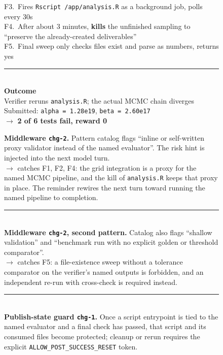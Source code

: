 \begin{figure}[t]
\begin{tcbraster}
\begin{tcolorbox}[colback=aheSky!18,colframe=aheNavy,colbacktitle=aheNavy,
                          title={\scriptsize\textbf{Before iteration 6 changes, iteration 5, reward 0.0}}]
            F3.~Fires \texttt{Rscript /app/analysis.R} as a background job, polls every 30s \\[2pt]
            F4.~After about 3 minutes, \textbf{kills} the unfinished sampling to ``preserve the already-created deliverables'' \\[2pt]
            F5.~Final sweep only checks files exist and parse as numbers, returns yes \\[3pt]
            \rule{\linewidth}{0.3pt}\\
            \textbf{\textcolor{aheNavy}{Outcome}} \\
            Verifier reruns \texttt{analysis.R}; the actual MCMC chain diverges \\
            Submitted: \texttt{alpha = 1.28e19}, \texttt{beta = 2.60e17} \\
            $\rightarrow$ \textbf{2 of 6 tests fail, reward 0}
        \end{tcolorbox}
        \begin{tcolorbox}[colback=black!3,colframe=black!65,colbacktitle=black!75,
                          title={\scriptsize\textbf{Iteration 6 changes that close each gap}}]
            \textbf{\textcolor{black!85}{Middleware \texttt{chg-2}.}} Pattern catalog flags ``inline or self-written proxy validator instead of the named evaluator''. The risk hint is injected into the next model turn. \\
            \textcolor{black!60}{$\rightarrow$ catches F1, F2, F4: the grid integration is a proxy for the named MCMC pipeline, and the kill of \texttt{analysis.R} keeps that proxy in place. The reminder rewires the next turn toward running the named pipeline to completion.} \\[3pt]
            \rule{\linewidth}{0.2pt}\\[1pt]
            \textbf{\textcolor{black!85}{Middleware \texttt{chg-2}, second pattern.}} Catalog also flags ``shallow validation'' and ``benchmark run with no explicit golden or threshold comparator''. \\
            \textcolor{black!60}{$\rightarrow$ catches F5: a file-existence sweep without a tolerance comparator on the verifier's named outputs is forbidden, and an independent re-run with cross-check is required instead.} \\[3pt]
            \rule{\linewidth}{0.2pt}\\[1pt]
            \textbf{\textcolor{black!85}{Publish-state guard \texttt{chg-1}.}} Once a script entrypoint is tied to the named evaluator and a final check has passed, that script and its consumed files become protected; cleanup or rerun requires the explicit \texttt{ALLOW\_POST\_SUCCESS\_RESET} token. \\

\end{tcolorbox}
\end{tcbraster}
\end{figure}
